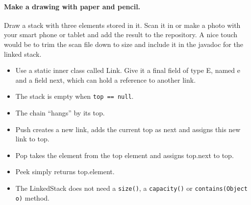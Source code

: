 \documentclass[twocolumn,a4paper]{article}
\providecommand\Code[1]{{\color{fontys}\ttfamily#1}}
\begin{document}
\paragraph{Make a drawing with paper and pencil.} Draw a stack with
three elements stored in it. Scan it in or make a photo with your
smart phone or tablet and add the
result to the repository. A nice touch would be to trim the scan
file down to size and include it in the javadoc for the linked
stack.

\begin{itemize}
\item Use a static inner class called \Code{Link}. Give it a final
  field of type E, named e and a field next, which can hold a
  reference to another link.
\item The stack is empty when \lstinline{top == null}.
\item The chain ``hangs'' by its top.
\item Push
  creates a new link, adds the current top as next and assigns this new
  link to top.
\item Pop takes the element from the top element and assigns top.next
  to top.
\item Peek simply returns top.element.
\item The LinkedStack does not need a \lstinline{size()}, a
  \lstinline{capacity()} or \lstinline{contains(Object o)} method.
\end{itemize}
\end{document}
